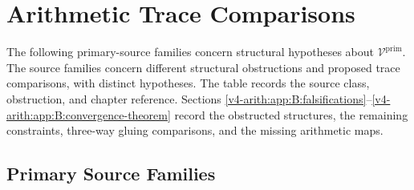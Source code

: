 \chapter{Arithmetic Trace Comparisons}
\label{v4-arith:app:fifteen-sources}

The following primary-source families concern structural
hypotheses about \(\mathcal{V}^{\mathrm{prim}}\). The source families concern different structural obstructions and
proposed trace comparisons, with distinct hypotheses. The
table records the source class, obstruction, and chapter reference.
Sections
\ref{v4-arith:app:B:falsifications}--\ref{v4-arith:app:B:convergence-theorem}
record the obstructed structures, the remaining constraints,
three-way gluing comparisons, and the missing arithmetic maps.

\section{Primary Source Families}
\label{v4-arith:app:B:fifteen}

